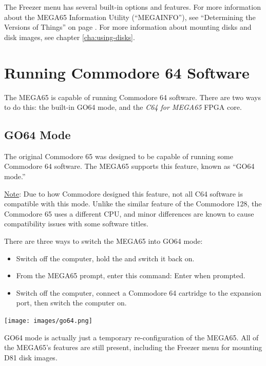The Freezer menu has several built-in options and features. For more information about the MEGA65 Information Utility (``MEGAINFO''), see ``Determining the Versions of Things'' on page \pageref{sec:versions}. For more information about mounting disks and disk images, see chapter \vref{cha:using-disks}.


\section{Running Commodore 64 Software}

The MEGA65 is capable of running Commodore 64 software. There are two ways to do this: the built-in GO64 mode, and the {\it C64 for MEGA65} FPGA core.

\subsection{GO64 Mode}

The original Commodore 65 was designed to be capable of running some Commodore 64 software. The MEGA65 supports this feature, known as ``GO64 mode.''

\underline{Note}: Due to how Commodore designed this feature, not all C64 software is compatible with this mode. Unlike the similar feature of the Commodore 128, the Commodore 65 uses a different CPU, and minor differences are known to cause compatibility issues with some software titles.

There are three ways to switch the MEGA65 into GO64 mode:

\begin{itemize}
    \item Switch off the computer, hold the \megasymbolkey and switch it back on.
    \item From the MEGA65  prompt, enter this command:  Enter  when prompted.
    \item Switch off the computer, connect a Commodore 64 cartridge to the expansion port, then switch the computer on.
\end{itemize}

\begin{center}
  \texttt{[image: images/go64.png]}
\end{center}

GO64 mode is actually just a temporary re-configuration of the MEGA65. All of the MEGA65's features are still present, including the Freezer menu for mounting D81 disk images.

